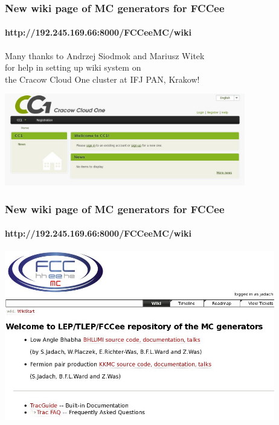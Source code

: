 \documentclass{beamer}
\begin{document}
\begin{frame}[fragile]
\frametitle{\bf New wiki page of MC generators for FCCee}
\framesubtitle{\bf http://192.245.169.66:8000/FCCeeMC/wiki}

Many thanks to Andrzej Siodmok and Mariusz Witek\\
for help in setting up wiki system on\\
the Cracow Cloud One cluster at IFJ PAN, Krakow!

\vspace{3mm}
\includegraphics[width=105mm]{./wiki_cc1.jpg}

\end{frame}

\begin{frame}[fragile]
\frametitle{\bf New wiki page of MC generators for FCCee}
\framesubtitle{\bf http://192.245.169.66:8000/FCCeeMC/wiki}

\includegraphics[width=118mm]{./wiki0.jpg}

\end{frame}
\end{document}
